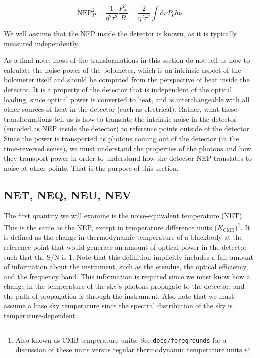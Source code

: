 \documentclass[twoside,10pt]{article}
\newcommand{\dd}[0]{\mathrm{d}}
\newcommand{\NEP}[0]{\mathrm{NEP}}
\newcommand{\KCMB}[0]{K_\mathrm{CMB}}
\begin{document}
\begin{equation}
    \NEP_P^2 = \frac{1}{\eta^2\tau^2} \frac{P_N^2}{B} = \frac{2}{\eta^2\tau^2} \int\dd\nu P_\nu h\nu
\end{equation}

We will assume that the NEP inside the detector is known, as it is typically
measured independently.

As a final note, most of the transformations in this section do not tell us
how to calculate the noise power of the bolometer, which is an intrinsic
aspect of the bolometer itself and should be computed from the perspective of
heat inside the detector. It is a property of the detector that is independent
of the optical loading, since optical power is converted to heat, and is
interchangeable with all other sources of heat in the detector (such as
electrical). Rather, what these transformations tell us is how to translate
the intrinsic noise in the detector (encoded as NEP inside the detector) to
reference points outside of the detector. Since the power is transported as
photons coming out of the detector (in the time-reversed sense), we must
understand the properties of the photons and how they transport power in order
to understand how the detector NEP translates to noise at other points. That
is the purpose of this section.

\subsection{NET, NEQ, NEU, NEV}
\label{sub:net_neq_neu_nev}

The first quantity we will examine is the noise-equivalent temperature (NET).
This is the same as the NEP, except in temperature difference units
($\unit{\KCMB}$)\footnote{Also known as CMB temperature units. See
\texttt{docs/foregrounds} for a discussion of these units versus regular
thermodynamic temperature units.}. It is defined as the change in
thermodynamic temperature of a blackbody at the reference point that would
generate an amount of optical power in the detector such that the S/N is 1.
Note that this definition implicitly includes a fair amount of information
about the instrument, such as the etendue, the optical efficiency, and the
frequency band. This information is required since we must know how a change
in the temperature of the sky's photons propagate to the detector, and the
path of propagation is through the instrument. Also note that we must assume a
base sky temperature since the spectral distribution of the sky is
temperature-dependent.
\end{document}
